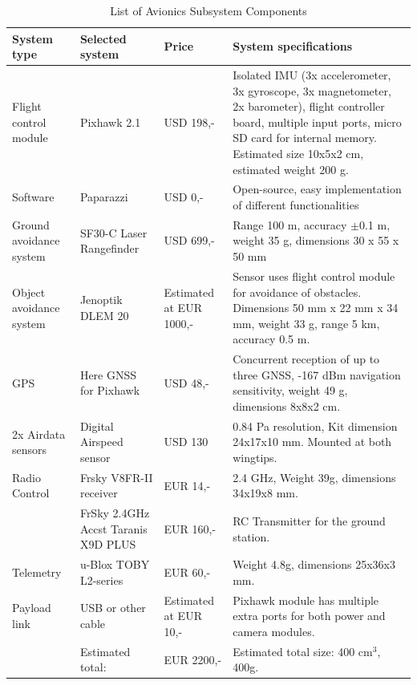 \begin{table}[ht]
    \centering
    \caption{List of Avionics Subsystem Components}
    \label{tab:avio_subs}
    \begin{tabularx}{\textwidth}{>{\small}p{} >{\small}p{} >{\small}p{} L}
    \toprule 
    \textbf{System type}     & \textbf{Selected system} & \textbf{Price} &\textbf{System specifications} 
    \\ \midrule
    Flight control module      & Pixhawk 2.1\footnotemark & USD 198,- & Isolated IMU (3x accelerometer, 3x gyroscope, 3x magnetometer, 2x barometer), flight controller board, multiple input ports, micro SD card for internal memory. Estimated size 10x5x2 cm, estimated weight 200 g. %
    \\ \hdashline
    Software            & Paparazzi\footnotemark & USD 0,- & Open-source, easy implementation of different functionalities
    \\ \hdashline
    Ground avoidance system & SF30-C Laser Rangefinder\footnotemark & USD 699,- & Range 100 m, accuracy $\pm$0.1 m, weight 35 g, dimensions 30 x 55 x 50 mm
    \\ \hdashline 
    Object avoidance system & Jenoptik DLEM 20\footnotemark & Estimated at EUR 1000,- & Sensor uses flight control module for avoidance of obstacles. Dimensions 50 mm x 22 mm x 34 mm, weight 33 g, range 5 km, accuracy 0.5 m.
    \\ \hdashline
    GPS & Here GNSS for Pixhawk\footnotemark & USD 48,- & Concurrent reception of up to three GNSS, -167 dBm navigation sensitivity, weight 49 g, dimensions 8x8x2 cm.
    \\ \hdashline
    2x Airdata sensors & Digital Airspeed sensor\footnotemark & USD 130 & 0.84 Pa resolution, Kit dimension 24x17x10 mm. Mounted at both wingtips. 
    \\ \hdashline
    Radio Control & Frsky V8FR-II receiver\footnotemark & EUR 14,- & 2.4 GHz, Weight 39g, dimensions 34x19x8 mm. \\
    & FrSky 2.4GHz Accst Taranis X9D PLUS\footnotemark & EUR 160,- & RC Transmitter for the ground station. 
    \\ \hdashline
    Telemetry & u-Blox TOBY L2-series \footnotemark &   EUR 60,- & Weight 4.8g, dimensions 25x36x3 mm.
    \\ \hdashline
    Payload link & USB or other cable & Estimated at EUR 10,- & Pixhawk module has multiple extra ports for both power and camera modules.
    \\ \midrule
     & Estimated total: & EUR 2200,- & Estimated total size: 400 cm$^3$, 400g.
    \\ \bottomrule
    \end{tabularx}
\end{table}


